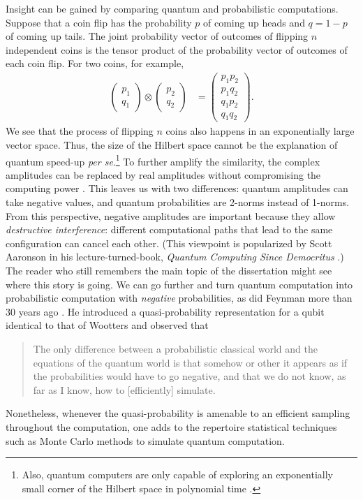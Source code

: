 Insight can be gained by comparing quantum and probabilistic computations. Suppose that a coin flip has the probability $p$ of coming up heads and $q=1-p$ of coming up tails. The joint probability vector of outcomes of flipping $n$ independent coins is the tensor product of the probability vector of outcomes of each coin flip. For two coins, for example,
\begin{align}
	\begin{pmatrix}
		p_1 \\ q_1
	\end{pmatrix}
	\otimes
	\begin{pmatrix}
		p_2 \\ q_2
	\end{pmatrix}
	&=
	\begin{pmatrix}
		p_1 p_2 \\
		p_1 q_2 \\
		q_1 p_2 \\
		q_1 q_2
	\end{pmatrix}.
\end{align}
We see that the process of flipping $n$ coins also happens in an exponentially large vector space. Thus, the size of the Hilbert space cannot be the explanation of quantum speed-up \emph{per se}.\footnote{Also, quantum computers are only capable of exploring an exponentially small corner of the Hilbert space in polynomial time \cite{poulin_quantum_2011}.} To further amplify the similarity, the complex amplitudes can be replaced by real amplitudes without compromising the computing power \cite{bernstein_quantum_1997,adleman_quantum_1997,rudolph_2_2002,aharonov_simple_2003}. This leaves us with two differences: quantum amplitudes can take negative values, and quantum probabilities
are 2-norms instead of 1-norms. From this perspective, negative amplitudes are important because they allow \emph{destructive interference}: different computational paths that lead to the same configuration can cancel each other. (This viewpoint is popularized by Scott Aaronson in his lecture-turned-book, \emph{Quantum Computing Since Democritus} \cite{aaronson2013democritus}.) The reader who still remembers the main topic of the dissertation might see where this story is going. We can go further and turn quantum computation into probabilistic computation with \emph{negative} probabilities, as did Feynman more than 30 years ago \cite{feynman_simulating_1982}. He introduced a quasi-probability representation for a qubit identical to that of Wootters \cite{wootters_wigner-function_1987} and observed that
\begin{quote}
The only difference between a probabilistic classical world and the equations of the quantum world is that somehow or other it appears as if the probabilities would have to go negative, and that we do not know, as far as I know, how to [efficiently] simulate.
\end{quote}
Nonetheless, whenever the quasi-probability is amenable to an efficient sampling throughout the computation, one adds to the repertoire statistical techniques such as Monte Carlo methods to simulate quantum computation.

